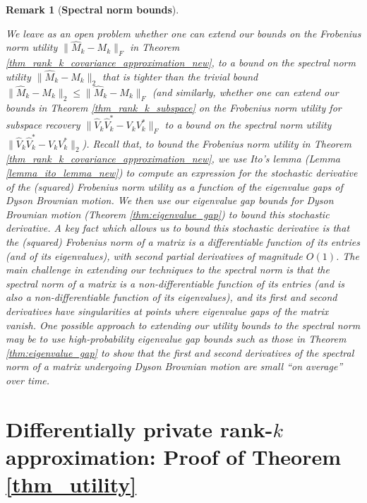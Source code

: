 \documentclass[11pt,letterpaper]{article}
\newtheorem{remark}[theorem]{Remark}
\begin{document}
     \begin{remark}[\bf Spectral norm bounds]\label{rem_spectral_norm}

We leave as an open problem whether one can extend our bounds on the Frobenius norm utility $\|\hat{M}_k -  M_k \|_F$ in Theorem \ref{thm_rank_k_covariance_approximation_new}, to a bound on the spectral norm utility $\|\hat{M}_k -  M_k \|_2$ that is tighter than the trivial bound $\|\hat{M}_k -  M_k \|_2 \leq \|\hat{M}_k -  M_k \|_F$ (and similarly, whether one can extend our bounds in Theorem \ref{thm_rank_k_subspace} on the Frobenius norm utility for subspace recovery $\|\hat{V}_k\hat{V}_k^\ast - V_k V_k^\ast \|_F$ to a bound on the spectral norm utility  $\|\hat{V}_k\hat{V}_k^\ast - V_k V_k^\ast \|_2$).
%
 Recall that, to bound the Frobenius norm utility in Theorem \ref{thm_rank_k_covariance_approximation_new}, we use Ito's lemma (Lemma \ref{lemma_ito_lemma_new}) to compute an expression for the stochastic derivative of the (squared) Frobenius norm utility as a function of the eigenvalue gaps of Dyson Brownian motion.
%
 We then use our eigenvalue gap bounds for Dyson Brownian motion (Theorem \ref{thm:eigenvalue_gap}) to bound this stochastic derivative.
A key fact which allows us to bound this stochastic derivative is that the (squared) Frobenius norm of a matrix is a differentiable function of its entries (and of its eigenvalues), with second partial derivatives of magnitude $O(1)$.
%
 The main challenge in extending our techniques to the spectral norm is that the spectral norm of a matrix is a non-differentiable function of its entries (and is also a non-differentiable function of its eigenvalues), and its first and second derivatives have singularities at points where eigenvalue gaps of the matrix vanish.
 One possible approach to extending our utility bounds to the spectral norm may be to use high-probability eigenvalue gap bounds such as those in Theorem \ref{thm:eigenvalue_gap} to show that the first and second derivatives of the spectral norm of a matrix undergoing Dyson Brownian motion are small ``on average'' over time.
 \end{remark}
 \color{black}

\section{Differentially private rank-$k$ approximation: Proof of Theorem \ref{thm_utility}} \label{sec_proof_utility_privacy}
\end{document}
